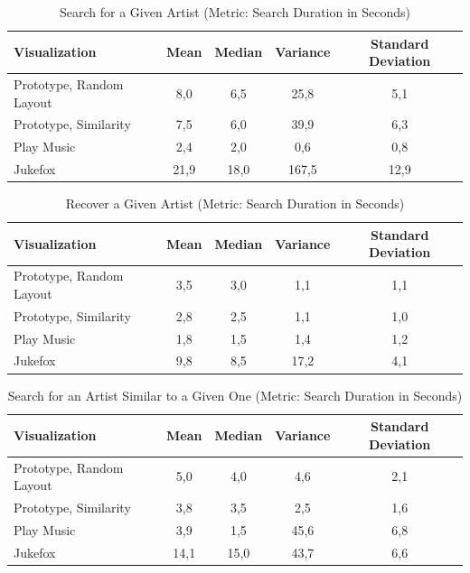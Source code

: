 \begin{table}[H]
\begin{center}
\begin{tabular}{ | l | c | c | c | c |}
	\hline
	\textbf{Visualization} & \textbf{Mean} & \textbf{Median} & \textbf{Variance} & \textbf{Standard Deviation}\\ \hline
	Prototype, Random Layout & 8,0 & 6,5 & 25,8 & 5,1 \\ \hline
	Prototype, Similarity & 7,5 & 6,0 & 39,9 & 6,3 \\ \hline
	Play Music & 2,4 & 2,0 & 0,6 & 0,8 \\ \hline
	Jukefox & 21,9 & 18,0 & 167,5 & 12,9 \\ \hline
\end{tabular}
\caption {Search for a Given Artist (Metric: Search Duration in Seconds)} \label{tab:search-for-given} 
\end{center}
\end{table}

\begin{table}[H]
\begin{center}
\begin{tabular}{ | l | c | c | c | c |}
	\hline
	\textbf{Visualization} & \textbf{Mean} & \textbf{Median} & \textbf{Variance} & \textbf{Standard Deviation}\\ \hline
	Prototype, Random Layout & 3,5 & 3,0 & 1,1 & 1,1 \\ \hline
	Prototype, Similarity & 2,8 & 2,5 & 1,1 & 1,0 \\ \hline
	Play Music & 1,8 & 1,5 & 1,4 & 1,2 \\ \hline
	Jukefox & 9,8 & 8,5 & 17,2 & 4,1 \\ \hline
\end{tabular}
\caption {Recover a Given Artist (Metric: Search Duration in Seconds)} \label{tab:refind-given} 
\end{center}
\end{table}

\begin{table}[H]
\begin{center}
\begin{tabular}{ | l | c | c | c | c |}
	\hline
	\textbf{Visualization} & \textbf{Mean} & \textbf{Median} & \textbf{Variance} & \textbf{Standard Deviation}\\ \hline
	Prototype, Random Layout & 5,0 & 4,0 & 4,6 & 2,1 \\ \hline
	Prototype, Similarity & 3,8 & 3,5 & 2,5 & 1,6 \\ \hline
	Play Music & 3,9 & 1,5 & 45,6 & 6,8 \\ \hline
	Jukefox & 14,1 & 15,0 & 43,7 & 6,6 \\ \hline
\end{tabular}
\caption {Search for an Artist Similar to a Given One (Metric: Search Duration in Seconds)} \label{tab:search-similar} 
\end{center}
\end{table}

